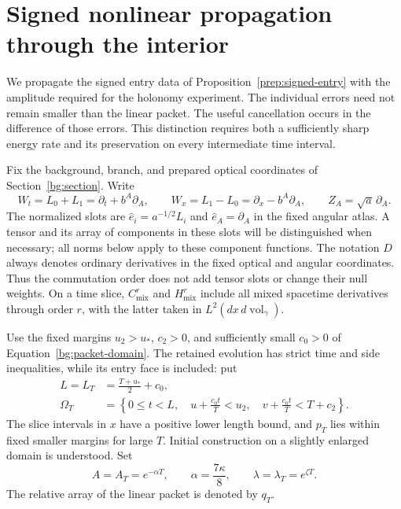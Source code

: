 \section{Signed nonlinear propagation through the interior}
\label{energy:section}

We propagate the signed entry data of Proposition~\ref{prep:signed-entry}
with the amplitude required for the holonomy experiment. The individual
errors need not remain smaller than the linear packet. The useful
cancellation occurs in the difference of those errors. This distinction
requires both a sufficiently sharp energy rate and its preservation on
every intermediate time interval.

Fix the background, branch, and prepared optical coordinates of
Section~\ref{bg:section}. Write
\[
 W_t=L_0+L_1=\partial_t+b^A\partial_A,
 \qquad W_x=L_1-L_0=\partial_x-b^A\partial_A,
 \qquad Z_A=\sqrt a\,\partial_A.
\]
The normalized slots are \(\hat e_i=a^{-1/2}L_i\) and
\(\hat e_A=\partial_A\) in the fixed angular atlas. A tensor and its
array of components in these slots will be distinguished when necessary;
all norms below apply to these component functions. The notation \(D\)
always denotes ordinary derivatives in the fixed optical and angular
coordinates. Thus the commutation order does not add tensor slots or
change their null weights. On a time slice, \(C^r_{\mathrm{mix}}\) and
\(H^r_{\mathrm{mix}}\) include all mixed spacetime derivatives through
order \(r\), with the latter taken in \(L^2(dx\,d\operatorname{vol}_\gamma)\).

Use the fixed margins \(u_2>u_*\), \(c_2>0\), and sufficiently small
\(c_0>0\) of Equation~\eqref{bg:packet-domain}. The retained evolution
has strict time and side inequalities, while its entry face is included:
put
\begin{equation}\label{energy:domain}
 \begin{split}
 L=L_T&=\frac{T+u_*}{2}+c_0,\\
 \Omega_T&=\left\{0\le t<L,\quad
 u+\frac{c_0t}{T}<u_2,\quad
 v+\frac{c_0t}{T}<T+c_2\right\}.
 \end{split}
\end{equation}
The slice intervals in \(x\) have a positive lower length bound, and
\(p_T\) lies within fixed smaller margins for large \(T\). Initial
construction on a slightly enlarged domain is understood. Set
\[
 A=A_T=e^{-\alpha T},\qquad \alpha=\frac{7\kappa}{8},
 \qquad \lambda=\lambda_T=e^{\zeta T}.
\]
The relative array of the linear packet is denoted by \(q_T\).

